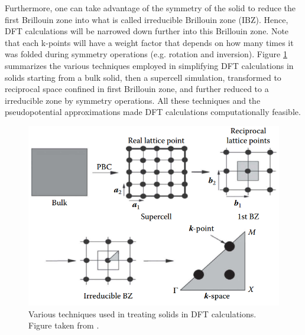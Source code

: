 Furthermore, one can take advantage of the symmetry of the solid to reduce the first Brillouin zone into what is called irreducible Brillouin zone (IBZ). Hence, DFT calculations will be narrowed down further into this Brillouin zone. Note that each k-points will have a weight factor that depends on how many times it was folded during symmetry operations (e.g. rotation and inversion). Figure \ref{fig:dft_solid} summarizes the various techniques employed in simplifying DFT calculations in solids starting from a bulk solid, then a supercell simulation, transformed to reciprocal space confined in first Brillouin zone, and further reduced to a irreducible zone by symmetry operations. All these techniques and the pseudopotential approximations made DFT calculations computationally feasible.
\begin{figure}[tbh!]
	\centering
	\includegraphics[width=0.6\linewidth]{"images/computational/dft_solid"}
	\caption[Various techniques used in treating solids in DFT calculations.]{Various techniques used in treating solids in DFT calculations. Figure taken from \citep{Lee2016}.}
	\label{fig:dft_solid}
\end{figure}

